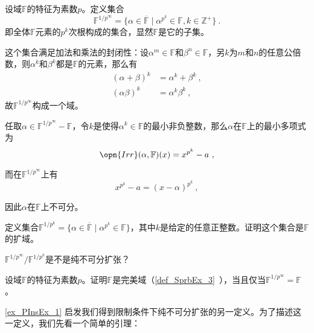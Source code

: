 \begin{example}{}\label{ex_PInsEx_1}
设域$\mathbb{F}$的特征为素数$p$。定义集合
\begin{equation}
\mathbb{F}^{1/p^\infty} = \{\alpha\in\overline{\mathbb{F}}\mid \alpha^{p^k}\in\mathbb{F}, k\in\mathbb{Z}^+\}~.
\end{equation}
即全体$\mathbb{F}$元素的$p^k$次根构成的集合，显然$\mathbb{F}$是它的子集。

这个集合满足加法和乘法的封闭性：设$\alpha^m\in\mathbb{F}$和$\beta^n\in\mathbb{F}$，另$k$为$m$和$n$的任意公倍数，则$\alpha^k$和$\beta^k$都是$\mathbb{F}$的元素，那么有
\begin{equation}
\begin{aligned}
(\alpha+\beta)^k&=\alpha^k+\beta^k~,\\
(\alpha\beta)^k&=\alpha^k\beta^k~,
\end{aligned}
\end{equation}
故$\mathbb{F}^{1/p^\infty}$构成一个域。

任取$\alpha\in\mathbb{F}^{1/p^\infty}-\mathbb{F}$，令$k$是使得$\alpha^k\in\mathbb{F}$的最小非负整数，那么$\alpha$在$\mathbb{F}$上的最小多项式为
\begin{equation}
\opn{Irr}(\alpha, \mathbb{F})(x) = x^{p^k}-a~,
\end{equation}

而在$\mathbb{F}^{1/p^\infty}$上有
\begin{equation}
x^{p^k}-a = (x-\alpha)^{p^k}~,
\end{equation}

因此$\alpha$在$\mathbb{F}$上不可分。

\end{example}



\begin{exercise}{}
定义集合$\mathbb{F}^{1/p^k}=\{\alpha\in\overline{\mathbb{F}}\mid \alpha^{p^k}\in\mathbb{F}\}$，其中$k$是给定的任意正整数。证明这个集合是$\mathbb{F}$的扩域。

$\mathbb{F}^{1/p^\infty}/\mathbb{F}^{1/p^k}$是不是纯不可分扩张？
\end{exercise}


\begin{exercise}{}
设域$\mathbb{F}$的特征为素数$p$。证明$\mathbb{F}$是完美域（\autoref{def_SprbEx_3}~），当且仅当$\mathbb{F}^{1/p^\infty}=\mathbb{F}$。
\end{exercise}



\autoref{ex_PInsEx_1} 启发我们得到限制条件下纯不可分扩张的另一定义。为了描述这一定义，我们先看一个简单的引理：

